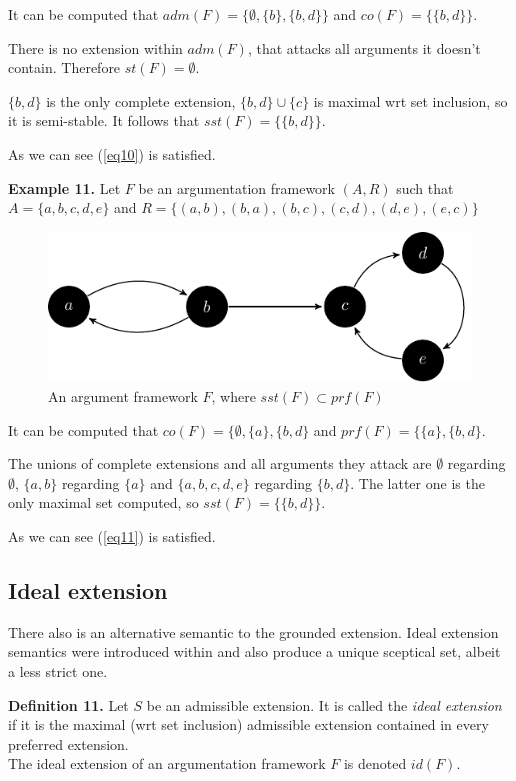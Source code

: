 \documentclass[draft,final]{vutinfth} %
\newcommand{\hl}{\par\vspace{6pt}} %
\newcommand{\cl}{\par\vspace{12pt}} %
\begin{document}
It can be computed that $adm(F)=\{\emptyset,\{b\},\{b,d\}\}$ and $co(F)=\{\{b,d\}\}$.\hl
There is no extension within $adm(F)$, that attacks all arguments it doesn't contain. Therefore $st(F)=\emptyset$.\hl
$\{b,d\}$ is the only complete extension, $\{b,d\}\cup \{c\}$ is maximal wrt set inclusion, so it is semi-stable. It follows that $sst(F)=\{\{b,d\}\}$.\hl
As we can see (\ref{eq10}) is satisfied.\cl

\textbf{Example 11.} Let $F$ be an argumentation framework $(A,R)$ such that $A=\{a,b,c,d,e\}$ and $R=\{(a,b),(b,a),(b,c),(c,d),(d,e),(e,c)\}$\hl

\FloatBarrier
	\begin{figure}[!h]
		\centering
		\includegraphics[width=\linewidth]{graphs/ex5.pdf}
		\caption{An argument framework $F$, where $sst(F)\subset prf(F)$}
	\end{figure}
\FloatBarrier

It can be computed that $co(F)=\{\emptyset,\{a\},\{b,d\}$ and $prf(F)=\{\{a\},\{b,d\}$.\hl
The unions of complete extensions and all arguments they attack are $\emptyset$ regarding $\emptyset$, $\{a,b\}$ regarding $\{a\}$ and $\{a,b,c,d,e\}$ regarding $\{b,d\}$. The latter one is the only maximal set computed, so $sst(F)=\{\{b,d\}\}$.\hl
As we can see (\ref{eq11}) is satisfied.\cl

\subsection{Ideal extension}
There also is an alternative semantic to the grounded extension. Ideal extension semantics were introduced within \cite{Alferes} and also produce a unique sceptical set, albeit a less strict one.\hl

\textbf{Definition 11.} Let $S$ be an admissible extension. It is called the \emph{ideal extension} if it is the maximal (wrt set inclusion) admissible extension contained in every preferred extension.\\
The ideal extension of an argumentation framework $F$ is denoted $id(F)$.\hl
\end{document}
